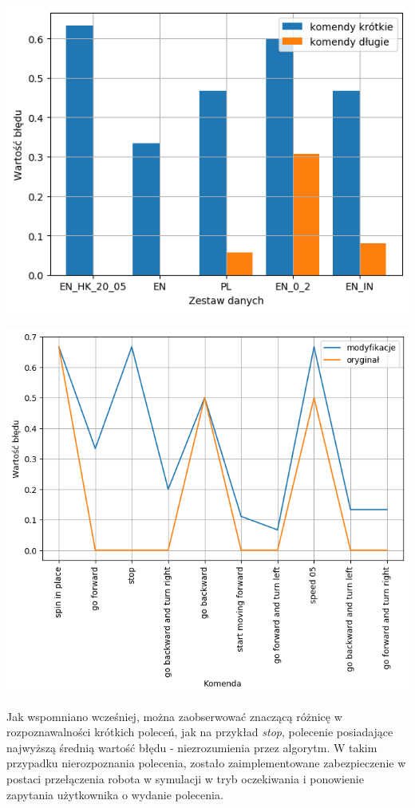 \begin{center}
    \includegraphics[width=0.8\linewidth]{files/output3.png}
    \label{fig:dts3}
\end{center}

\begin{center}
    \includegraphics[width=0.8\linewidth]{files/output5.png}
    \label{fig:dts4}
\end{center}

Jak wspomniano wcześniej, można zaobserwować znaczącą różnicę w rozpoznawalności krótkich poleceń, jak na przykład \textit{stop}, polecenie posiadające najwyższą średnią wartość błędu - niezrozumienia przez algorytm. W takim przypadku nierozpoznania polecenia, zostało zaimplementowane zabezpieczenie w postaci przełączenia robota w symulacji w tryb oczekiwania i ponowienie zapytania użytkownika o wydanie polecenia. 

